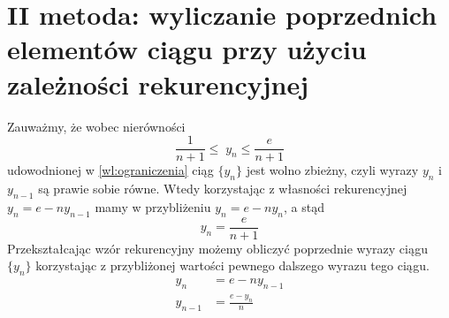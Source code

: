 \documentclass[11pt,wide]{article}
\begin{document}
\section{II metoda: wyliczanie poprzednich elementów ciągu przy użyciu zależności rekurencyjnej}
Zauważmy, że wobec nierówności
\begin{equation}
\frac{1}{n+1} \leq \; y_n \leq \frac{e}{n+1}
\end{equation}
udowodnionej w \eqref{wl:ograniczenia} ciąg \(\{y_n\}\) jest wolno zbieżny, czyli wyrazy \(y_n\) i \(y_{n-1}\) są prawie sobie równe. Wtedy korzystając z własności rekurencyjnej \(y_{n} = e - n y_{n-1}\) mamy w przybliżeniu  \(y_{n} = e - ny_{n}\), a stąd 
\begin{equation}
y_{n} = \frac{e}{n+1}
\end{equation}
Przekształcając wzór rekurencyjny możemy obliczyć poprzednie wyrazy ciągu \(\{y_n\}\) korzystając z przybliżonej wartości pewnego dalszego wyrazu tego ciągu.
\begin{align} 
y_n &= e - n y_{n-1} \\
y_{n-1} &= \frac{e - y_n}{n} \label{tw:poprzednielem}
\end{align}

\end{document}
